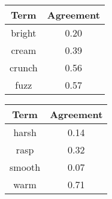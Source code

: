 \begin{tabular}{|c|c|}
	\hline
	\bf{Term} & \bf{Agreement} \tabularnewline
	\hline
	\hline
	bright & 0.20 \tabularnewline
	\hline
	cream & 0.39 \tabularnewline
	\hline
	crunch & 0.56 \tabularnewline
	\hline
	fuzz & 0.57 \tabularnewline
	\hline
\end{tabular}
\qquad
\begin{tabular}{|c|c|}
	\hline
	\bf{Term} & \bf{Agreement} \tabularnewline
	\hline
	\hline
	harsh & 0.14 \tabularnewline
	\hline
	rasp & 0.32 \tabularnewline
	\hline
	smooth & 0.07 \tabularnewline
	\hline
	warm & 0.71 \tabularnewline
	\hline
\end{tabular}
